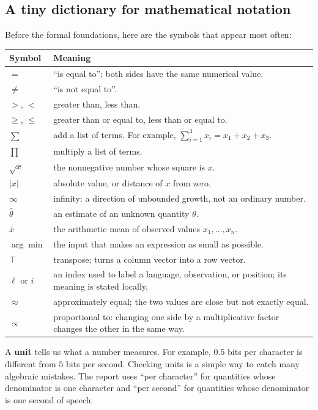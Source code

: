 \documentclass[11pt]{article}
\begin{document}
\subsection*{A tiny dictionary for mathematical notation}
Before the formal foundations, here are the symbols that appear most often:
\begin{center}
\begin{tabularx}{0.96\textwidth}{p{}X}
\toprule
Symbol & Meaning \\
\midrule
$=$ & ``is equal to''; both sides have the same numerical value. \\
$\neq$ & ``is not equal to''. \\
$>$, $<$ & greater than, less than. \\
$\ge$, $\le$ & greater than or equal to, less than or equal to. \\
$\sum$ & add a list of terms. For example, $\sum_{i=1}^3x_i=x_1+x_2+x_3$. \\
$\prod$ & multiply a list of terms. \\
$\sqrt{x}$ & the nonnegative number whose square is $x$. \\
$|x|$ & absolute value, or distance of $x$ from zero. \\
$\infty$ & infinity: a direction of unbounded growth, not an ordinary number. \\
$\hat\theta$ & an estimate of an unknown quantity $\theta$. \\
$\bar x$ & the arithmetic mean of observed values $x_1,\ldots,x_n$. \\
$\arg\min$ & the input that makes an expression as small as possible. \\
$\top$ & transpose; turns a column vector into a row vector. \\
$\ell$ or $i$ & an index used to label a language, observation, or position; its meaning is stated locally. \\
$\approx$ & approximately equal; the two values are close but not exactly equal. \\
$\propto$ & proportional to: changing one side by a multiplicative factor changes the other in the same way. \\
\bottomrule
\end{tabularx}
\end{center}
A \textbf{unit} tells us what a number measures. For example, $0.5$ bits per character is different from $5$ bits per second. Checking units is a simple way to catch many algebraic mistakes. The report uses ``per character'' for quantities whose denominator is one character and ``per second'' for quantities whose denominator is one second of speech.
\end{document}
